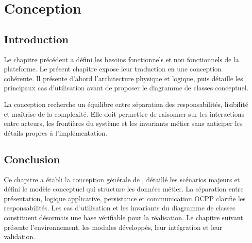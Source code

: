 \chapter{Conception}

\section*{Introduction}

Le chapitre précédent a défini les besoins fonctionnels et non fonctionnels de la
plateforme. Le présent chapitre expose leur traduction en une conception
cohérente. Il présente d'abord l'architecture physique et logique, puis détaille
les principaux cas d'utilisation avant de proposer le diagramme de classes
conceptuel.

La conception recherche un équilibre entre séparation des responsabilités,
lisibilité et maîtrise de la complexité. Elle doit permettre de raisonner sur les
interactions entre acteurs, les frontières du système et les invariants métier
sans anticiper les détails propres à l'implémentation.





\section*{Conclusion}

Ce chapitre a établi la conception générale de \ProjectName{}, détaillé les
scénarios majeurs et défini le modèle conceptuel qui structure les données métier.
La séparation entre présentation, logique applicative, persistance et
communication OCPP clarifie les responsabilités. Les cas d'utilisation et les
invariants du diagramme de classes constituent désormais une base vérifiable pour
la réalisation. Le chapitre suivant présente l'environnement, les modules
développés, leur intégration et leur validation.
